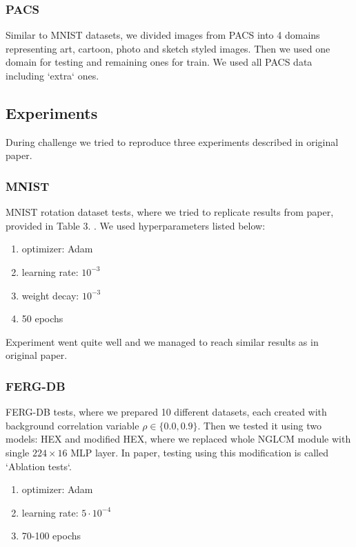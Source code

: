 \documentclass{article} %
\begin{document}
\subsubsection{PACS}

Similar to MNIST datasets, we divided images from PACS into 4 domains representing art, cartoon, photo and sketch styled
images. Then we used one domain for testing and remaining ones for train. We used all PACS data including `extra` ones.

\pagebreak

\subsection{Experiments}

During challenge we tried to reproduce three experiments described in original paper.

\subsubsection{MNIST}
    MNIST rotation dataset tests, where we tried to replicate results from paper, provided in Table 3. \citep{wang2018learning}. We used hyperparameters listed below:
        
        \begin{enumerate}
            \item optimizer: Adam
            \item learning rate: $10^{-3}$
            \item weight decay: $10^{-3}$
            \item 50 epochs
        \end{enumerate}

    Experiment went quite well and we managed to reach similar results as in original paper.

\subsubsection{FERG-DB}
    FERG-DB tests, where we prepared 10 different datasets, each created with background correlation variable $\rho \in\{0.0, 0.9\}$. Then we
    tested it using two models: HEX and modified HEX, where we replaced whole NGLCM module with single $224\times16$ MLP layer. In paper, testing using this modification is called `Ablation tests`.
        
        \begin{enumerate}
            \item optimizer: Adam
            \item learning rate: $5\cdot10^{-4}$
            \item 70-100 epochs
        \end{enumerate}
\end{document}
